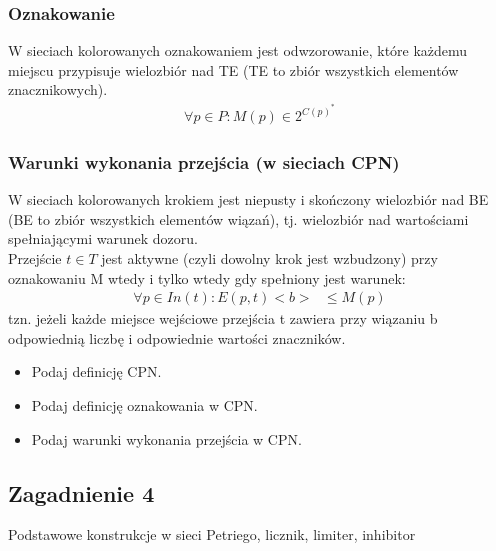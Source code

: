 \documentclass[a4paper,15pt]{article}
\newcommand{\question}[2]{
    \begin{tcolorbox}[colback=black!5!white,colframe=black,title={Zagadnienie #1}]
        #2
    \end{tcolorbox}
}
\begin{document}
\subsubsection{Oznakowanie}
W sieciach kolorowanych oznakowaniem jest odwzorowanie, które każdemu miejscu przypisuje wielozbiór nad TE (TE to zbiór wszystkich elementów znacznikowych).
\begin{align*}
\forall p \in P: M(p) \in 2^{C(p)^*}
\end{align*}

\subsubsection{Warunki wykonania przejścia (w sieciach CPN) }
W sieciach kolorowanych krokiem jest niepusty i skończony wielozbiór nad BE (BE to zbiór wszystkich elementów wiązań), tj. wielozbiór nad wartościami spełniającymi warunek dozoru. \\
Przejście $t \in T$ jest aktywne (czyli dowolny krok jest wzbudzony) przy oznakowaniu M wtedy i tylko wtedy gdy spełniony jest warunek:
\begin{align*}
\forall p \in In(t): E(p,t)<b> \text{ } \leq  M(p)
\end{align*}
tzn. jeżeli każde miejsce wejściowe przejścia t zawiera przy wiązaniu b odpowiednią liczbę i odpowiednie wartości znaczników.


\begin{framed}
\begin{itemize}
\item Podaj definicję CPN.
\item Podaj definicję oznakowania w CPN.
\item Podaj warunki wykonania przejścia w CPN. 
\end{itemize}
\end{framed}

\newpage
\subsection{Zagadnienie 4}
\question{4}{
Podstawowe konstrukcje w sieci Petriego, licznik, limiter, inhibitor
}
\end{document}
